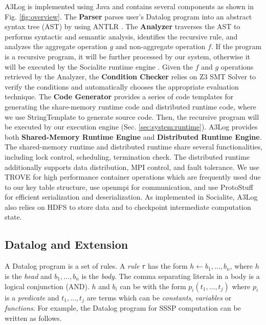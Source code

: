 A3Log is implemented using Java and contains several components as shown in Fig. \ref{fig:overview}. The \textbf{Parser} parses user's Datalog program into an abstract syntax tree (AST) by using ANTLR \cite{antlr}. The \textbf{Analyzer} traverses the AST to performs syntactic and semantic analysis, identifies the recursive rule, and analyzes the aggregate operation $g$ and non-aggregate operation $f$. If the program is a recursive program, it will be further processed by our system, otherwise it will be executed by the Socialite runtime engine \cite{Lam:2013:SDE:2510649.2511289,Seo:2013:DSD:2556549.2556572}. Given the $f$ and $g$ operations retrieved by the Analyzer, the \textbf{Condition Checker} relies on Z3 SMT Solver \cite{DeMoura:2008:ZES:1792734.1792766,z3} to verify the conditions and automatically chooses the appropriate evaluation technique. The \textbf{Code Generator} provides a series of code templates for generating the share-memory runtime code and distributed runtime code, where we use StringTemplate \cite{stringtemplate} to generate source code. Then, the recursive program will be executed by our execution engine (Sec. \ref{sec:system:runtime}). A3Log provides both \textbf{Shared-Memory Runtime Engine} and \textbf{Distributed Runtime Engine}. The shared-memory runtime and distributed runtime share several functionalities, including lock control, scheduling, termination check. The distributed runtime additionally supports data distribution, MPI control, and fault tolerance. We use TROVE \cite{trove} for high performance container operations which are frequently used due to our key table structure, use openmpi \cite{mpich} for  communication, and use ProtoStuff \cite{kryo} for efficient serialization and deserialization. As implemented in Socialite, A3Log also relies on HDFS to store data and to checkpoint intermediate computation state.

\subsection{Datalog and Extension}
\label{sec:system:datalog}

A Datalog program is a set of rules. A \emph{rule} \texttt{r} has the form $h\leftarrow b_1,\ldots,b_n$, where $h$ is the \emph{head} and $b_1,\ldots,b_n$ is the \emph{body}. The comma separating literals in a body is a logical conjunction (AND). $h$ and $b_i$ can be with the form $p_i(t_1,\ldots,t_j)$ where $p_i$ is a \emph{predicate} and $t_1,\ldots,t_j$ are terms which can be \emph{constants}, \emph{variables} or \emph{functions}. For example, the Datalog program for SSSP computation can be written as follows.

